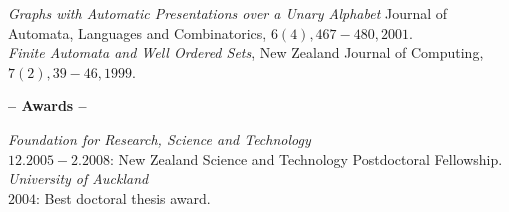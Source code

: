 \documentclass[a4paper]{article}
\def\tit#1{\medskip \begin{center}  {\Large {\bf -- #1 -- }} \end{center}}
\newif\ifcut
\begin{document}
{\it Graphs with Automatic Presentations over a Unary Alphabet}
Journal of Automata, Languages and Combinatorics, $6(4), 467-480, 2001$. \\

{\it Finite Automata and Well Ordered Sets},
New Zealand Journal of Computing, $7(2), 39-46, 1999$. 

%
%
% 
%
%
%

\iffalse

{\it Finite Automata and Algebraic Structures},
with Bakhadyr Khoussainov, 
Abstracts of Symposium on Logic and Applications, Novosibirsk, May $2000$. \\

{\it On Automata Presentable Structures},
with Bakhadyr Khoussainov, 
Abstracts of papers presented to the American Mathematical Society, 
$20(2), 1999$. \\ 
\fi



\ifcut
\tit{Awards}

{\em Foundation for Research, Science and Technology}\\ 
$12.2005-2.2008$: New Zealand Science and Technology Postdoctoral Fellowship.\\ 

{\em University of Auckland}\\
$2004$: Best doctoral thesis award.
\end{document}

